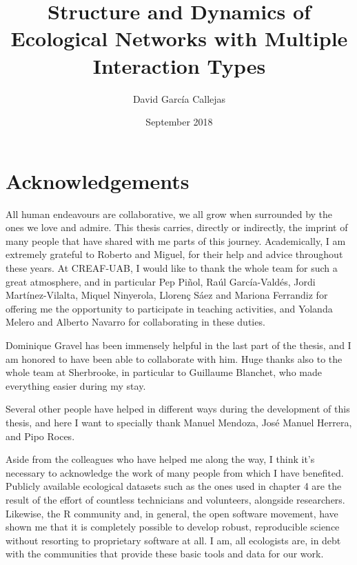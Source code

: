 \documentclass[12pt,a4paper,twoside,fleqn]{memoir}
\title{Structure and Dynamics of Ecological Networks with Multiple Interaction Types} %
\author{David García Callejas} %
\date{September 2018} %
\begin{document}
\begin{titlingpage}
\maketitle %
\end{titlingpage}

\frontmatter %


\section*{Acknowledgements}

All human endeavours are collaborative, we all grow when surrounded by the ones we love and admire. This thesis carries, directly or indirectly, the imprint of many people that have shared with me parts of this journey. Academically, I am extremely grateful to Roberto and Miguel, for their help and advice throughout these years. At CREAF-UAB, I would like to thank the whole team for such a great atmosphere, and in particular Pep Piñol, Raúl García-Valdés, Jordi Martínez-Vilalta, Miquel Ninyerola, Llorenç Sáez and Mariona Ferrandiz for offering me the opportunity to participate in teaching activities, and Yolanda Melero and Alberto Navarro for collaborating in these duties.

Dominique Gravel has been immensely helpful in the last part of the thesis, and I am honored to have been able to collaborate with him. Huge thanks also to the whole team at Sherbrooke, in particular to Guillaume Blanchet, who made everything easier during my stay.

Several other people have helped in different ways during the development of this thesis, and here I want to specially thank Manuel Mendoza, José Manuel Herrera, and Pipo Roces.

Aside from the colleagues who have helped me along the way, I think it's necessary to acknowledge the work of many people from which I have benefited. Publicly available ecological datasets such as the ones used in chapter 4 are the result of the effort of countless technicians and volunteers, alongside researchers. Likewise, the R community and, in general, the open software movement, have shown me that it is completely possible to develop robust, reproducible science without resorting to proprietary software at all. I am, all ecologists are, in debt with the communities that provide these basic tools and data for our work.
\end{document}
